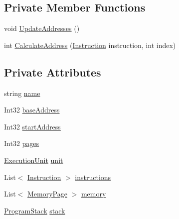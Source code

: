 \subsection*{Private Member Functions}
\begin{DoxyCompactItemize}
\item 
void \hyperlink{class_c_p_u___o_s___simulator_1_1_c_p_u_1_1_simulator_program_a4f7e933d4f3ca318d68471d465c6b31c}{Update\+Addresses} ()
\item 
int \hyperlink{class_c_p_u___o_s___simulator_1_1_c_p_u_1_1_simulator_program_a6ab84d4093d03fc387e4288dfc566388}{Calculate\+Address} (\hyperlink{class_c_p_u___o_s___simulator_1_1_c_p_u_1_1_instruction}{Instruction} instruction, int index)
\end{DoxyCompactItemize}
\subsection*{Private Attributes}
\begin{DoxyCompactItemize}
\item 
string \hyperlink{class_c_p_u___o_s___simulator_1_1_c_p_u_1_1_simulator_program_ad4797b5d81ceb01cd4207a97b7af36c5}{name}
\item 
Int32 \hyperlink{class_c_p_u___o_s___simulator_1_1_c_p_u_1_1_simulator_program_aaea4fb02fb8d22806ce58b957f9b573d}{base\+Address}
\item 
Int32 \hyperlink{class_c_p_u___o_s___simulator_1_1_c_p_u_1_1_simulator_program_a7b2581eff41da814292bf29936ab5318}{start\+Address}
\item 
Int32 \hyperlink{class_c_p_u___o_s___simulator_1_1_c_p_u_1_1_simulator_program_ac4d19d17c7ee206ad6343884f3390054}{pages}
\item 
\hyperlink{class_c_p_u___o_s___simulator_1_1_c_p_u_1_1_execution_unit}{Execution\+Unit} \hyperlink{class_c_p_u___o_s___simulator_1_1_c_p_u_1_1_simulator_program_a10e4c29c3ed9b84c0fb8aee7613cabf9}{unit}
\item 
List$<$ \hyperlink{class_c_p_u___o_s___simulator_1_1_c_p_u_1_1_instruction}{Instruction} $>$ \hyperlink{class_c_p_u___o_s___simulator_1_1_c_p_u_1_1_simulator_program_a30b501e0b2d012212077059be49857cf}{instructions}
\item 
List$<$ \hyperlink{class_c_p_u___o_s___simulator_1_1_memory_1_1_memory_page}{Memory\+Page} $>$ \hyperlink{class_c_p_u___o_s___simulator_1_1_c_p_u_1_1_simulator_program_a402e53ae5daf1b6be0d5b7b705091c9c}{memory}
\item 
\hyperlink{class_c_p_u___o_s___simulator_1_1_c_p_u_1_1_program_stack}{Program\+Stack} \hyperlink{class_c_p_u___o_s___simulator_1_1_c_p_u_1_1_simulator_program_a85f44af349486db4b141b3946bf21a64}{stack}
\end{DoxyCompactItemize}


